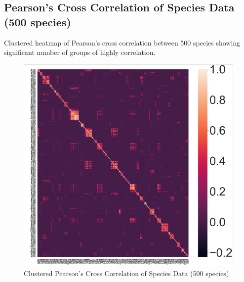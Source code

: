 \documentclass{article}
\begin{document}
\subsection{Pearson's Cross Correlation of Species Data (500 species)}
Clustered heatmap of Pearson's cross correlation between 500 species showing significant number of groups of highly correlation.
\begin{figure}
    \centering
    \includegraphics[width=1\linewidth]{Species_Cross_Correlation.png}
    \caption{Clustered Pearson's Cross Correlation of Species Data (500 species)}
    \label{fig:enter-label}
\end{figure}

\clearpage
\end{document}
